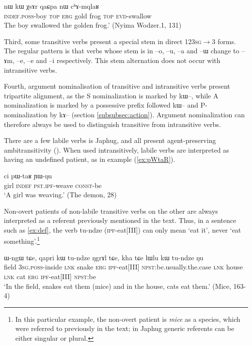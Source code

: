 \documentclass[oldfontcommands,oneside,a4paper,11pt]{article}
\newcommand{\ipa}[1]{{\phon \mbox{#1}}} %
\begin{document}
\begin{exe}
\ex \label{ex:erg}
\gll \ipa{tɤ-tɕɯ}  	\ipa{nɯ}  	\ipa{kɯ}  	\ipa{χsɤr}  	\ipa{qaɕpa}  	\ipa{nɯ}  	\ipa{cʰɤ-mqlaʁ}   \\
\textsc{indef.poss}-boy \textsc{top} \textsc{erg} gold frog \textsc{top} \textsc{evd}-swallow \\
\glt  The boy swallowed the golden frog.' (Nyima Wodzer.1, 131)
\end{exe}

Third,  some transitive verbs present a special stem in direct \textsc{123sg}$\rightarrow$3 forms. The regular pattern is that verbs whose stem is in --\ipa{o}, --\ipa{u}, --\ipa{a} and --\ipa{ɯ} change to --\ipa{ɤm}, --\ipa{e}, --\ipa{e} and --\ipa{i} respectively. This stem alternation does not occur with intransitive verbs.

Fourth, argument nominalisation of transitive   and intransitive  verbs present tripartite alignment, as the S nominalization is marked by \ipa{kɯ}--, while A nominalization is marked by a possessive prefix followed \ipa{kɯ}-- and P-nominalization by \ipa{kɤ}-- (section \ref{subsubsec:action}). Argument nominalization can therefore always be used to distinguish transitive from intransitive verbs.


There are a few labile verbs is Japhug, and all present agent-preserving ambitransitivity  (\citealt[217-9]{jacques12demotion}). When used intransitively, labile verbs are interpreted as having an undefined patient, as in example (\ref{ex:pWtaR}).

 \begin{exe}
\ex \label{ex:pWtaR}
\gll  \ipa{tɕʰeme} 	\ipa{ci} 	\ipa{pɯ-taʁ} 	\ipa{ɲɯ-ŋu}  \\
girl \textsc{indef} \textsc{pst.ipf}-weave \textsc{const}-be \\
\glt `A girl was weaving.' (The demon, 28)
 \end{exe}
 
Non-overt patients of non-labile transitive verbs on the other are always interpreted  as a referent previously mentioned in the text. Thus,  in a sentence such as \ref{ex:def}, the verb \ipa{tu-ndze} (\textsc{ipf}-eat[III]) can only mean `eat it', never `eat something'.\footnote{In this particular example, the non-overt patient is \textit{mice} as a species, which were referred to previously in the text; in Japhug generic referents can be either singular or plural.}

\begin{exe}
\ex \label{ex:def}
\gll  \ipa{tɯji} 	\ipa{ɯ-ngɯ} 	\ipa{tɕe,} 	\ipa{qapri} 	\ipa{kɯ} 	\ipa{tu-ndze} 	\ipa{ŋgrɤl} 	\ipa{tɕe,} 						
\ipa{kha} 	\ipa{tɕe} 	\ipa{lɯlu} 	\ipa{kɯ} 	\ipa{tu-ndze} 	\ipa{ŋu} 	    \\
field \textsc{3sg.poss}-inside \textsc{lnk} snake \textsc{erg} \textsc{ipf}-eat[III] \textsc{npst}:be.usually.the.case \textsc{lnk} house  \textsc{lnk}  cat \textsc{erg} \textsc{ipf}-eat[III] \textsc{npst}:be \\
\glt `In the field,   snakes  eat  them (mice) and in the house,    cats eat  them.'  (Mice, 163-4) 
\end{exe}
\end{document}
